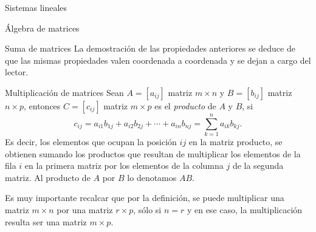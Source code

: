 \begin{chapter}{Sistemas lineales}
\begin{section}{\'Algebra de matrices}
\begin{subsection}{Suma  de matrices}
                La demostración de las propiedades anteriores se deduce de que las mismas propiedades valen coordenada a coordenada y se dejan a cargo del lector. 
            \end{subsection}		
            
            \begin{subsection}{Multiplicaci\'on de matrices}  Sean $A=[a_{ij}]$ matriz $m \times n$ y 		 $B=[b_{ij}]$ matriz $n \times p$, entonces $C=[c_{ij}]$ matriz $m \times p$  es el \textit{producto} de $A$ y $B$, si 
                \begin{equation}\label{mtrx-mult}
                c_{ij} = a_{i1}b_{1j}+a_{i2}b_{2j}+\cdots+a_{in}b_{nj}= \sum_{k=1}^{n}a_{ik}b_{kj}.
                \end{equation}
                Es decir, los elementos que ocupan la posición $ij$ en la matriz producto, se obtienen sumando 	los productos que resultan de multiplicar los elementos de la fila $i$ en la primera matriz por los
                elementos de la columna $j$ de la segunda matriz. Al producto de $A$ por $B$ lo denotamos $AB$. 

                Es muy importante recalcar que por la definición, se puede multiplicar una matriz $m \times n$ por una matriz $r \times p$, sólo si $n=r$ y en ese caso, la multiplicación resulta ser una matriz $m \times p$. 


\end{subsection}
\end{section}
\end{chapter}
